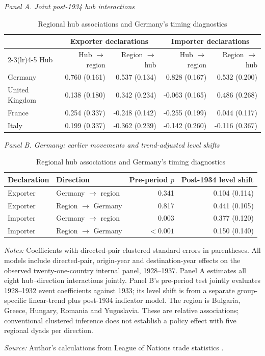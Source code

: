 \begin{table}[!htbp]\centering
\caption{Regional hub associations and Germany's timing diagnostics}\label{tab:germany}
\begin{threeparttable}\small\setlength{\tabcolsep}{4pt}
\textit{Panel A. Joint post-1934 hub interactions}\\[4pt]
\begin{tabular}{@{}lrrrr@{}}
\toprule
& \multicolumn{2}{c}{Exporter declarations} & \multicolumn{2}{c}{Importer declarations}\\
\cmidrule(lr){2-3}\cmidrule(lr){4-5}
Hub & Hub $\to$ region & Region $\to$ hub & Hub $\to$ region & Region $\to$ hub\\
\midrule
Germany & 0.760 (0.161) & 0.537 (0.134) & 0.828 (0.167) & 0.532 (0.200) \\
United Kingdom & 0.138 (0.180) & 0.342 (0.234) & -0.063 (0.165) & 0.486 (0.268) \\
France & 0.254 (0.337) & -0.248 (0.142) & -0.255 (0.199) & 0.044 (0.117) \\
Italy & 0.199 (0.337) & -0.362 (0.239) & -0.142 (0.260) & -0.116 (0.367) \\
\bottomrule\end{tabular}
\par\medskip\textit{Panel B. Germany: earlier movements and trend-adjusted level shifts}\\[4pt]
\begin{tabular}{@{}llrr@{}}
\toprule
Declaration & Direction & Pre-period $p$ & Post-1934 level shift\\\midrule
Exporter & Germany $\to$ region & 0.341 & 0.104 (0.114) \\
Exporter & Region $\to$ Germany & 0.817 & 0.441 (0.105) \\
Importer & Germany $\to$ region & 0.003 & 0.377 (0.120) \\
Importer & Region $\to$ Germany & $<0.001$ & 0.150 (0.140) \\
\bottomrule\end{tabular}
\begin{tablenotes}[flushleft]\footnotesize
\item \textit{Notes:} Coefficients with directed-pair clustered standard errors in parentheses. All models include directed-pair,
origin-year and destination-year effects on the observed twenty-one-country internal panel, 1928--1937.
Panel A estimates all eight hub--direction interactions jointly. Panel B's pre-period test jointly evaluates
1928--1932 event coefficients against 1933; its level shift is from a separate group-specific linear-trend plus
post-1934 indicator model. The region is Bulgaria, Greece, Hungary, Romania and Yugoslavia. These are relative
associations; conventional clustered inference does not establish a policy effect with five regional dyads per direction.
\item \textit{Source:} Author's calculations from League of Nations trade statistics \parencite{league1930,league1936,league1938}.
\end{tablenotes}\end{threeparttable}\end{table}
